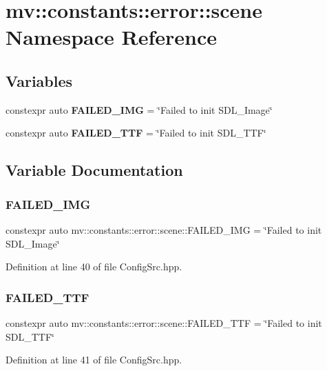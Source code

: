 \section{mv\+:\+:constants\+:\+:error\+:\+:scene Namespace Reference}
\label{namespacemv_1_1constants_1_1error_1_1scene}
\subsection*{Variables}
\begin{DoxyCompactItemize}
\item 
constexpr auto \textbf{ F\+A\+I\+L\+E\+D\+\_\+\+I\+MG} = \char`\"{}Failed to init S\+D\+L\+\_\+\+Image\char`\"{}
\item 
constexpr auto \textbf{ F\+A\+I\+L\+E\+D\+\_\+\+T\+TF} = \char`\"{}Failed to init S\+D\+L\+\_\+\+T\+TF\char`\"{}
\end{DoxyCompactItemize}


\subsection{Variable Documentation}
\mbox{\label{namespacemv_1_1constants_1_1error_1_1scene_ada4d657ddb9c8e7e2de57ac7fc480aae}} 
\subsubsection{F\+A\+I\+L\+E\+D\+\_\+\+I\+MG}
{\footnotesize\ttfamily constexpr auto mv\+::constants\+::error\+::scene\+::\+F\+A\+I\+L\+E\+D\+\_\+\+I\+MG = \char`\"{}Failed to init S\+D\+L\+\_\+\+Image\char`\"{}}



Definition at line 40 of file Config\+Src.\+hpp.

\mbox{\label{namespacemv_1_1constants_1_1error_1_1scene_af9cc7764f1f3ccbb0145b57ed35840a5}} 
\subsubsection{F\+A\+I\+L\+E\+D\+\_\+\+T\+TF}
{\footnotesize\ttfamily constexpr auto mv\+::constants\+::error\+::scene\+::\+F\+A\+I\+L\+E\+D\+\_\+\+T\+TF = \char`\"{}Failed to init S\+D\+L\+\_\+\+T\+TF\char`\"{}}



Definition at line 41 of file Config\+Src.\+hpp.

